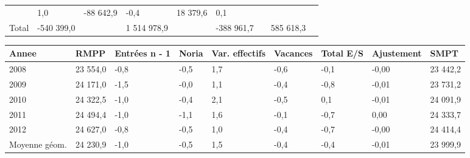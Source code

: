 \begin{longtable}[]{@{}lllllllll@{}}
\begin{minipage}[t]{0.17\columnwidth}
\end{minipage} & \begin{minipage}[t]{0.06\columnwidth}\raggedright
1,0\strut
\end{minipage} & \begin{minipage}[t]{0.12\columnwidth}\raggedright
-88 642,9\strut
\end{minipage} & \begin{minipage}[t]{0.06\columnwidth}\raggedright
-0,4\strut
\end{minipage} & \begin{minipage}[t]{0.08\columnwidth}\raggedright
18 379,6\strut
\end{minipage} & \begin{minipage}[t]{0.06\columnwidth}\raggedright
0,1\strut
\end{minipage}\tabularnewline
\begin{minipage}[t]{0.05\columnwidth}\raggedright
Total\strut
\end{minipage} & \begin{minipage}[t]{0.10\columnwidth}\raggedright
-540 399,0\strut
\end{minipage} & \begin{minipage}[t]{0.06\columnwidth}\raggedright
\strut
\end{minipage} & \begin{minipage}[t]{0.17\columnwidth}\raggedright
1 514 978,9\strut
\end{minipage} & \begin{minipage}[t]{0.06\columnwidth}\raggedright
\strut
\end{minipage} & \begin{minipage}[t]{0.12\columnwidth}\raggedright
-388 961,7\strut
\end{minipage} & \begin{minipage}[t]{0.06\columnwidth}\raggedright
\strut
\end{minipage} & \begin{minipage}[t]{0.08\columnwidth}\raggedright
585 618,3\strut
\end{minipage} & \begin{minipage}[t]{0.06\columnwidth}\raggedright
\strut
\end{minipage}\tabularnewline
\bottomrule
\end{longtable}

\begin{longtable}[]{@{}lllllllll@{}}
\toprule
Annee & RMPP & Entrées n - 1 & Noria & Var. effectifs & Vacances & Total
E/S & Ajustement & SMPT\tabularnewline
\midrule
\endhead
2008 & 23 554,0 & -0,8 & -0,5 & 1,7 & -0,6 & -0,1 & -0,00 & 23
442,2\tabularnewline
2009 & 24 171,0 & -1,5 & -0,0 & 1,1 & -0,4 & -0,8 & -0,01 & 23
731,2\tabularnewline
2010 & 24 322,5 & -1,0 & -0,4 & 2,1 & -0,5 & 0,1 & -0,01 & 24
091,9\tabularnewline
2011 & 24 494,4 & -1,0 & -1,1 & 1,6 & -0,1 & -0,7 & 0,00 & 24
333,7\tabularnewline
2012 & 24 627,0 & -0,8 & -0,5 & 1,0 & -0,4 & -0,7 & -0,00 & 24
414,4\tabularnewline
Moyenne géom. & 24 230,9 & -1,0 & -0,5 & 1,5 & -0,4 & -0,4 & -0,01 & 23
999,9\tabularnewline
\bottomrule
\end{longtable}

